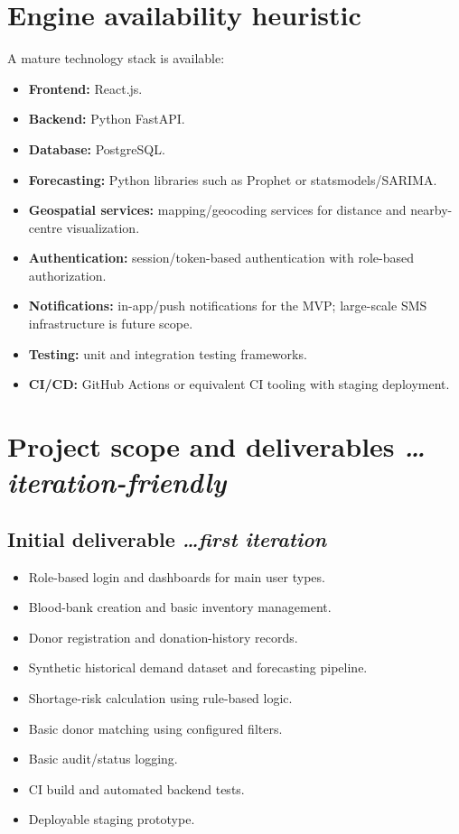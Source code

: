 \documentclass[11pt,a4paper]{article}
\newcommand{\BvrHint}[1]{{\normalfont\normalsize\itshape\hfill #1}}
\begin{document}
\section{Engine availability heuristic}
A mature technology stack is available:
\begin{itemize}[leftmargin=0.7cm]
\item \textbf{Frontend:} React.js.
\item \textbf{Backend:} Python FastAPI.
\item \textbf{Database:} PostgreSQL.
\item \textbf{Forecasting:} Python libraries such as Prophet or statsmodels/SARIMA.
\item \textbf{Geospatial services:} mapping/geocoding services for distance and nearby-centre visualization.
\item \textbf{Authentication:} session/token-based authentication with role-based authorization.
\item \textbf{Notifications:} in-app/push notifications for the MVP; large-scale SMS infrastructure is future scope.
\item \textbf{Testing:} unit and integration testing frameworks.
\item \textbf{CI/CD:} GitHub Actions or equivalent CI tooling with staging deployment.
\end{itemize}

\section{Project scope and deliverables \BvrHint{\ldots iteration-friendly}}
\subsection{Initial deliverable \BvrHint{\ldots first iteration}}
\begin{itemize}[leftmargin=0.7cm]
\item Role-based login and dashboards for main user types.
\item Blood-bank creation and basic inventory management.
\item Donor registration and donation-history records.
\item Synthetic historical demand dataset and forecasting pipeline.
\item Shortage-risk calculation using rule-based logic.
\item Basic donor matching using configured filters.
\item Basic audit/status logging.
\item CI build and automated backend tests.
\item Deployable staging prototype.
\end{itemize}
\end{document}
